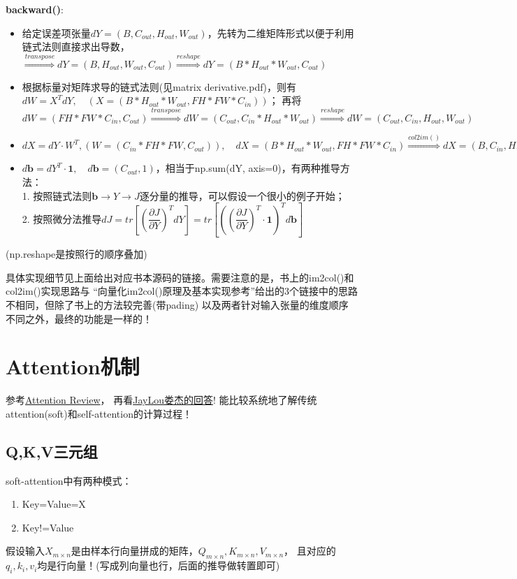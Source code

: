 \documentclass[UTF8]{article}
\begin{document}
    \textbf{backward()}:
    \begin{itemize}
        \item 给定误差项张量$dY=(B,C_{out}, H_{out}, W_{out})$，先转为二维矩阵形式以便于利用链式法则直接求出导数，$\stackrel{transpose}{\Longrightarrow} dY=(B, H_{out}, W_{out}, C_{out})\stackrel{reshape}{\Longrightarrow} dY=(B*H_{out}*W_{out}, C_{out})$
        \item 根据标量对矩阵求导的链式法则(见matrix derivative.pdf)，则有\\ $dW=X^{T}dY,\quad (X=(B*H_{out}*W_{out}, FH*FW*C_{in}))$；
        再将$dW=(FH*FW*C_{in}, C_{out}) \stackrel{transpose}{\Longrightarrow} dW=(C_{out}, C_{in}*H_{out}*W_{out})\stackrel{reshape}{\Longrightarrow} dW=(C_{out}, C_{in}, H_{out}, W_{out})$
        \item $dX=dY\cdot W^{T}, (W=(C_{in}*FH*FW, C_{out})), \quad dX=(B*H_{out}*W_{out}, FH*FW*C_{in}) \stackrel{col2im()}{\Longrightarrow} dX=(B, C_{in}, H, W)$
        \item $d\boldsymbol{b}=dY^{T}\cdot \boldsymbol{1},\quad d\boldsymbol{b}=(C_{out},1)$，相当于np.sum(dY, axis=0)，有两种推导方法：\\
        1. 按照链式法则$\boldsymbol{b}\rightarrow Y \rightarrow J$逐分量的推导，可以假设一个很小的例子开始；
        \\
        2. 按照微分法推导$dJ=tr[(\dfrac{\partial J}{\partial Y})^{T}dY]=tr[((\dfrac{\partial J}{\partial Y})^{T}\cdot \boldsymbol{1})^{T}d\boldsymbol{b}]$
    \end{itemize}
    (np.reshape是按照行的顺序叠加)

    具体实现细节见上面给出对应书本源码的链接。需要注意的是，书上的im2col()和col2im()实现思路与
    “向量化im2col()原理及基本实现参考”给出的3个链接中的思路不相同，但除了书上的方法较完善(带pading)
    以及两者针对输入张量的维度顺序不同之外，最终的功能是一样的！

    \section{Attention机制}
    参考\href{https://zhuanlan.zhihu.com/p/106662375}{Attention Review}，
    再看\href{https://www.zhihu.com/question/68482809}{JayLou娄杰的回答}!
    能比较系统地了解传统attention(soft)和self-attention的计算过程！

    \subsection{Q,K,V三元组}
    soft-attention中有两种模式：
    \begin{enumerate}
        \item Key=Value=X
        \item Key!=Value
    \end{enumerate}
    假设输入$X_{m\times n}$是由样本行向量拼成的矩阵，$Q_{m\times n},K_{m\times n},V_{m\times n}$，
    且对应的$q_{i},k_{i},v_{i}$均是行向量！(写成列向量也行，后面的推导做转置即可)
\end{document}
